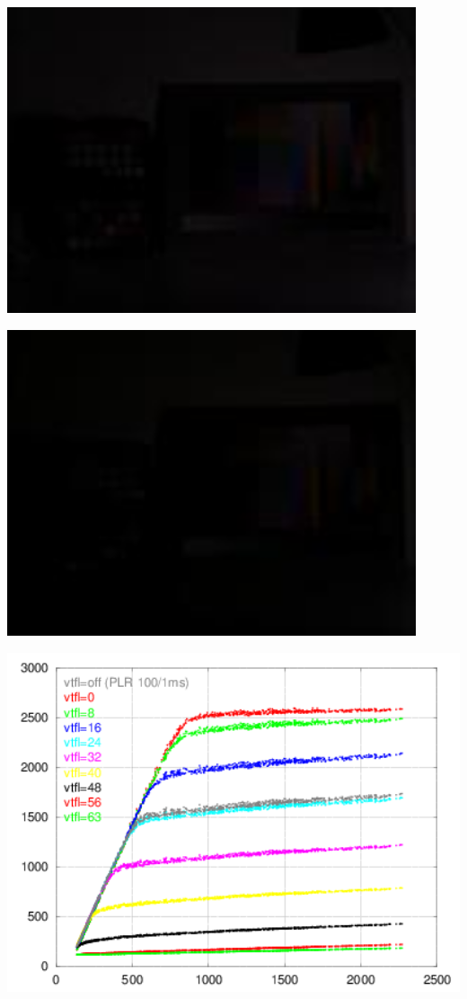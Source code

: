 \begin{center}
\includegraphics[height=9cm]{images/100ms-1ms-56-tiny}
\end{center}

\begin{center}
\includegraphics[height=9cm]{images/100ms-1ms-63-tiny}
\end{center}

\begin{center}
\includegraphics[height=10cm]{images/100-1-x-plr-vs-30ms-lin}
\end{center}

